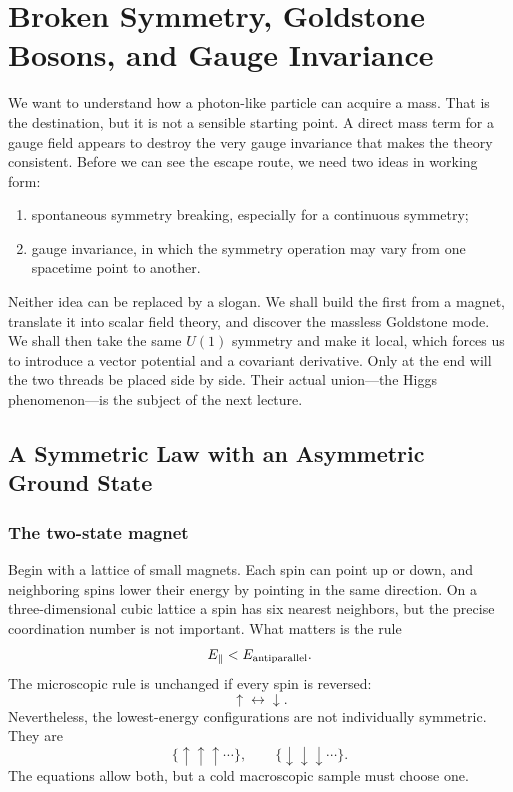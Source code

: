 \chapter{Broken Symmetry, Goldstone Bosons, and Gauge Invariance}

We want to understand how a photon-like particle can acquire a mass. That is
the destination, but it is not a sensible starting point. A direct mass term
for a gauge field appears to destroy the very gauge invariance that makes the
theory consistent. Before we can see the escape route, we need two ideas in
working form:
\begin{enumerate}
  \item spontaneous symmetry breaking, especially for a continuous symmetry;
  \item gauge invariance, in which the symmetry operation may vary from one
        spacetime point to another.
\end{enumerate}
Neither idea can be replaced by a slogan. We shall build the first from a
magnet, translate it into scalar field theory, and discover the massless
Goldstone mode. We shall then take the same \(U(1)\) symmetry and make it
local, which forces us to introduce a vector potential and a covariant
derivative. Only at the end will the two threads be placed side by side. Their
actual union---the Higgs phenomenon---is the subject of the next lecture.

\section{A Symmetric Law with an Asymmetric Ground State}

\subsection{The two-state magnet}

Begin with a lattice of small magnets. Each spin can point up or down, and
neighboring spins lower their energy by pointing in the same direction. On a
three-dimensional cubic lattice a spin has six nearest neighbors, but the
precise coordination number is not important. What matters is the rule
\begin{equation}
  E_{\parallel}<E_{\rm antiparallel}.
\end{equation}
The microscopic rule is unchanged if every spin is reversed:
\begin{equation}
  \uparrow\longleftrightarrow\downarrow.
\end{equation}
Nevertheless, the lowest-energy configurations are not individually
symmetric. They are
\begin{equation}
  \{\uparrow\uparrow\uparrow\cdots\},
  \qquad
  \{\downarrow\downarrow\downarrow\cdots\}.
\end{equation}
The equations allow both, but a cold macroscopic sample must choose one.

